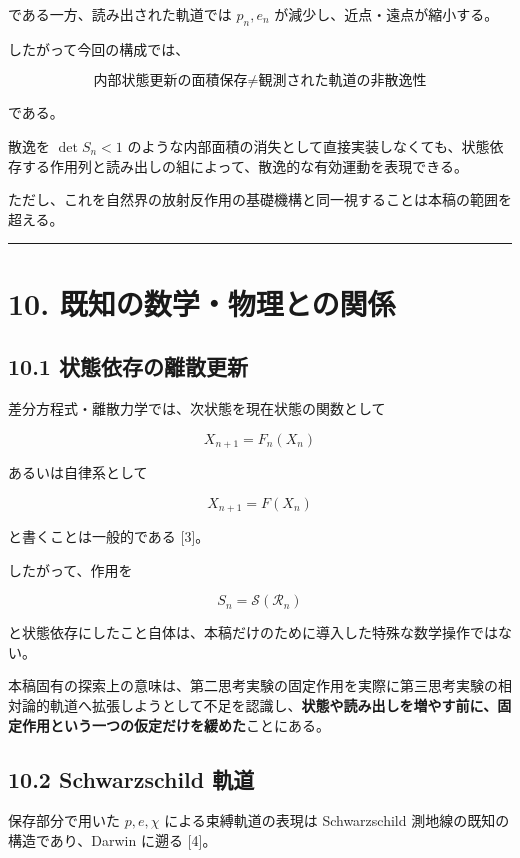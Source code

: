 \documentclass[
  a4paper,
]{ltjsarticle}
\begin{document}
である一方、読み出された軌道では \(p_n,e_n\)
が減少し、近点・遠点が縮小する。

したがって今回の構成では、

\[
\boxed{
\text{内部状態更新の面積保存}
\neq
\text{観測された軌道の非散逸性}
}
\]

である。

散逸を \(\det S_n<1\)
のような内部面積の消失として直接実装しなくても、状態依存する作用列と読み出しの組によって、散逸的な有効運動を表現できる。

ただし、これを自然界の放射反作用の基礎機構と同一視することは本稿の範囲を超える。

\begin{center}\rule{0.5\linewidth}{0.5pt}\end{center}

\section{10.
既知の数学・物理との関係}\label{ux65e2ux77e5ux306eux6570ux5b66ux7269ux7406ux3068ux306eux95a2ux4fc2}

\subsection{10.1
状態依存の離散更新}\label{ux72b6ux614bux4f9dux5b58ux306eux96e2ux6563ux66f4ux65b0}

差分方程式・離散力学では、次状態を現在状態の関数として

\[
X_{n+1}=F_n(X_n)
\]

あるいは自律系として

\[
X_{n+1}=F(X_n)
\]

と書くことは一般的である {[}3{]}。

したがって、作用を

\[
S_n=\mathcal S(\mathcal R_n)
\]

と状態依存にしたこと自体は、本稿だけのために導入した特殊な数学操作ではない。

本稿固有の探索上の意味は、第二思考実験の固定作用を実際に第三思考実験の相対論的軌道へ拡張しようとして不足を認識し、\textbf{状態や読み出しを増やす前に、固定作用という一つの仮定だけを緩めた}ことにある。

\subsection{10.2 Schwarzschild 軌道}\label{schwarzschild-ux8eccux9053}

保存部分で用いた \(p,e,\chi\) による束縛軌道の表現は Schwarzschild
測地線の既知の構造であり、Darwin に遡る {[}4{]}。
\end{document}
